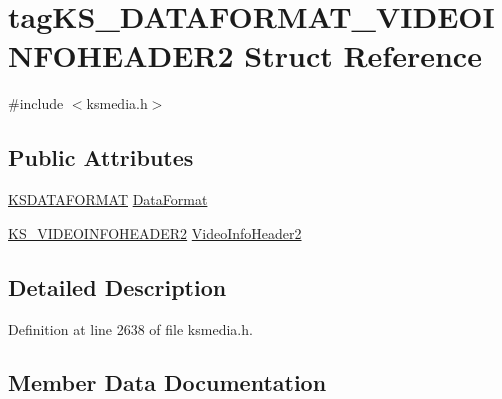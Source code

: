 \hypertarget{structtag_k_s___d_a_t_a_f_o_r_m_a_t___v_i_d_e_o_i_n_f_o_h_e_a_d_e_r2}{}\section{tag\+K\+S\+\_\+\+D\+A\+T\+A\+F\+O\+R\+M\+A\+T\+\_\+\+V\+I\+D\+E\+O\+I\+N\+F\+O\+H\+E\+A\+D\+E\+R2 Struct Reference}
\label{structtag_k_s___d_a_t_a_f_o_r_m_a_t___v_i_d_e_o_i_n_f_o_h_e_a_d_e_r2}


{\ttfamily \#include $<$ksmedia.\+h$>$}

\subsection*{Public Attributes}
\begin{DoxyCompactItemize}
\item 
\hyperlink{union_k_s_d_a_t_a_f_o_r_m_a_t}{K\+S\+D\+A\+T\+A\+F\+O\+R\+M\+AT} \hyperlink{structtag_k_s___d_a_t_a_f_o_r_m_a_t___v_i_d_e_o_i_n_f_o_h_e_a_d_e_r2_a2096132d988d02eb2f91882e28a4e3b4}{Data\+Format}
\item 
\hyperlink{ksmedia_8h_a505f5a953699cb697dc04dace56b49d5}{K\+S\+\_\+\+V\+I\+D\+E\+O\+I\+N\+F\+O\+H\+E\+A\+D\+E\+R2} \hyperlink{structtag_k_s___d_a_t_a_f_o_r_m_a_t___v_i_d_e_o_i_n_f_o_h_e_a_d_e_r2_adb24e45bbb6eaee2fff388ceaf8b67cc}{Video\+Info\+Header2}
\end{DoxyCompactItemize}


\subsection{Detailed Description}


Definition at line 2638 of file ksmedia.\+h.



\subsection{Member Data Documentation}
